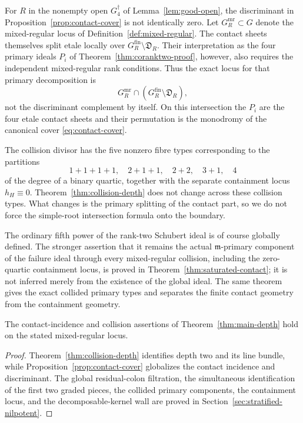 For $R$ in the nonempty open $G_4^\dagger$ of
Lemma~\ref{lem:good-open}, the discriminant in
Proposition~\ref{prop:contact-cover} is not identically zero.
Let $G_R^{\mathrm{mr}}\subset G$ denote the mixed-regular locus of
Definition~\ref{def:mixed-regular}.  The contact sheets themselves
split etale locally over
$G_R^{\mathrm{fin}}\setminus\mathfrak D_R$.  Their interpretation
as the four primary ideals $P_i$ of
Theorem~\ref{thm:coranktwo-proof}, however, also requires the
independent mixed-regular rank conditions.  Thus the exact locus for
that primary decomposition is
\[
 G_R^{\mathrm{mr}}\cap
 (G_R^{\mathrm{fin}}\setminus\mathfrak D_R),
\]
not the discriminant complement by itself.  On this intersection the
$P_i$ are the four etale contact sheets and their permutation is the
monodromy of the canonical cover \eqref{eq:contact-cover}.

The collision divisor has the five nonzero fibre types corresponding
to the partitions
\[
 1+1+1+1,\quad 2+1+1,\quad2+2,\quad3+1,\quad4
\]
of the degree of a binary quartic, together with the separate
containment locus $h_H\equiv0$.  Theorem~\ref{thm:collision-depth}
does not change across these collision types.  What changes is the
primary splitting of the contact part, so we do not force the
simple-root intersection formula onto the boundary.

The ordinary fifth power of the rank-two Schubert ideal is of course
globally defined.  The stronger assertion that it remains the actual
$\mathfrak m$-primary component of the failure ideal through every
mixed-regular collision, including the zero-quartic containment locus,
is proved in Theorem~\ref{thm:saturated-contact}; it is not inferred
merely from the existence of the global ideal.  The same theorem gives
the exact collided primary types and separates the finite contact
geometry from the containment geometry.

\begin{corollary}
\label{cor:main-depth-proof}
The contact-incidence and collision assertions of
Theorem~\ref{thm:main-depth} hold on the stated mixed-regular locus.
\end{corollary}
\begin{proof}
Theorem~\ref{thm:collision-depth} identifies depth two and its line
bundle, while Proposition~\ref{prop:contact-cover} globalizes the
contact incidence and discriminant.  The global residual-colon
filtration, the simultaneous identification of the first two graded
pieces, the collided primary components, the containment locus, and
the decomposable-kernel wall are proved in
Section~\ref{sec:stratified-nilpotent}.
\end{proof}
